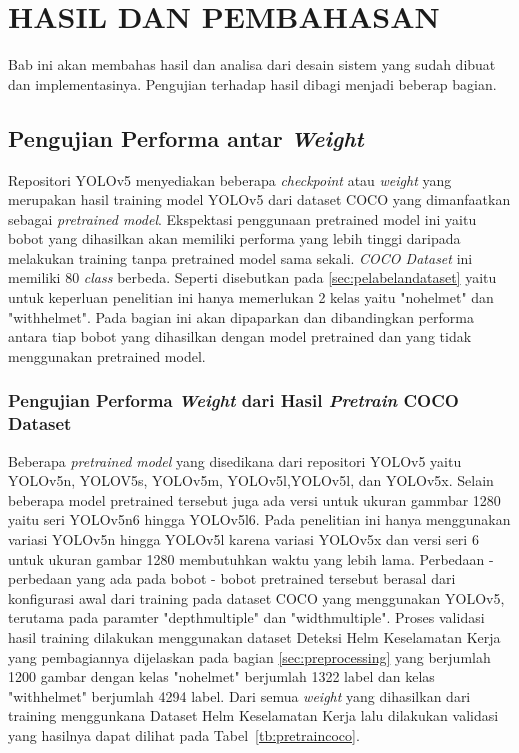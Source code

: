\chapter{HASIL DAN PEMBAHASAN}
\label{chap:hasilpembahasan}


Bab ini akan membahas hasil dan analisa dari desain sistem yang sudah dibuat dan implementasinya. Pengujian terhadap hasil dibagi menjadi beberap bagian.

\section{Pengujian Performa antar \emph{Weight}}
\label{sec:ujiperforma}
Repositori YOLOv5 menyediakan beberapa \emph{checkpoint} atau \emph{weight} yang merupakan hasil training model YOLOv5 dari dataset COCO yang dimanfaatkan sebagai \emph{pretrained model}. Ekspektasi penggunaan pretrained model ini yaitu bobot yang dihasilkan akan memiliki performa yang lebih tinggi daripada melakukan training tanpa pretrained model sama sekali. \emph{COCO Dataset} ini memiliki 80 \emph{class} berbeda. Seperti disebutkan pada \ref{sec:pelabelandataset} yaitu untuk keperluan penelitian ini hanya memerlukan 2 kelas yaitu "no\textunderscore helmet" dan "with\textunderscore helmet". Pada bagian ini akan dipaparkan dan dibandingkan performa antara tiap bobot yang dihasilkan dengan model pretrained dan yang tidak menggunakan pretrained model.

\subsection{Pengujian Performa \emph{Weight} dari Hasil \emph{Pretrain} COCO Dataset}
\label{subsec:ujiperforma_coco}
Beberapa \emph{pretrained model} yang disedikana dari repositori YOLOv5 yaitu YOLOv5n, YOLOV5s, YOLOv5m, YOLOv5l,YOLOv5l, dan YOLOv5x. Selain beberapa model pretrained tersebut juga ada versi untuk ukuran gammbar 1280 yaitu seri YOLOv5n6 hingga YOLOv5l6. Pada penelitian ini hanya menggunakan variasi YOLOv5n hingga YOLOv5l karena variasi YOLOv5x dan versi seri 6 untuk ukuran gambar 1280 membutuhkan waktu yang lebih lama. Perbedaan - perbedaan yang ada pada bobot - bobot pretrained tersebut berasal dari konfigurasi awal dari training pada dataset COCO yang menggunakan YOLOv5, terutama pada paramter "depth\textunderscore multiple" dan "width\textunderscore multiple".
Proses validasi hasil training dilakukan menggunakan dataset Deteksi Helm Keselamatan Kerja yang pembagiannya dijelaskan pada bagian \ref{sec:preprocessing} yang berjumlah 1200 gambar dengan kelas "no\textunderscore helmet" berjumlah 1322 label dan kelas "with\textunderscore helmet" berjumlah 4294 label. Dari semua \emph{weight} yang dihasilkan dari training menggunkana Dataset Helm Keselamatan Kerja lalu dilakukan validasi yang hasilnya dapat dilihat pada Tabel~\ref{tb:pretraincoco}.


